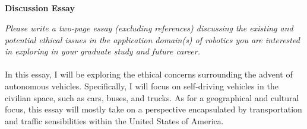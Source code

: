 \documentclass[12pt]{article}
\title{
    \vspace{2in}
    \textmd{\textbf{\hmwkClass\ \hmwkTitle}}\\
    \vspace{3in}
}
\author{\hmwkAuthorName}
\date{}
\begin{document}
\maketitle

\pagebreak

\begin{center}
    \large\textbf{Discussion Essay}
\end{center}

\textit{Please write a two-page essay (excluding references) discussing the existing and potential 
ethical issues in the application domain(s) of robotics you are interested in exploring in your 
graduate study and future career.}\\
\vspace{0in}\\
In this essay, I will be exploring the ethical concerns surrounding the advent of autonomous vehicles.
Specifically, I will focus on self-driving vehicles in the civilian space, such as cars, buses, and trucks.
As for a geographical and cultural focus, this essay will mostly take on a perspective encapsulated by 
transportation and traffic sensibilities within the United States of America.\\
\vspace{0in}\\
\end{document}
